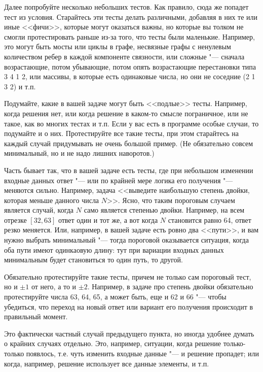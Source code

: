 \documentclass[a4paper,10pt]{problems}
\begin{document}
Далее попробуйте несколько небольших тестов. Как правило, сюда же попадет тест из условия. 
Старайтесь эти тесты делать различными, добавляя в них те или иные <<фичи>>, которые могут оказаться важны, 
но которые вы толком не смогли протестировать раньше из-за того, что тесты были маленькие. 
Например, это могут быть мосты или циклы в графе, несвязные графы с ненулевым количеством ребер в каждой компоненте связности, 
или сложные "--- сначала возрастающие, потом убывающие, потом опять возрастающие перестановки типа 3 4 1 2, или массивы, в которые есть одинаковые числа, 
но они не соседние (2 1 3 2) и т.п.

Подумайте, какие в вашей задаче могут быть <<подлые>> тесты. 
Например, когда решения нет, или когда решение в каком-то смысле пограничное, или не такое, как во многих тестах и т.п.
Если у вас есть в программе особые случаи, то подумайте и о них. 
Протестируйте все такие тесты, при этом старайтесь на каждый случай придумывать не очень большой пример. 
(Не обязательно совсем минимальный, но и не надо лишних наворотов.)

Часть бывает так, что в вашей задаче есть тесты, где при небольшом изменении входные данных ответ "--- или по крайней мере логика его получения "--- меняются сильно.
Например, задача <<выведите наибольшую степень двойки, которая меньше данного числа $N$>>. 
Ясно, что таким пороговым случаем является случай, когда $N$ само является степенью двойки. 
Например, на всем отрезке $[32,63]$ ответ один и тот же, а вот когда $N$ становится равно 64, ответ резко меняется.
Или, например, в вашей задаче есть ровно два <<пути>>, и вам нужно выбрать минимальный "--- тогда пороговой оказывается ситуация,
когда оба пути имеют одинкаовую длину: тут при вариации входных данных минимальным будет становиться то один путь, то другой.

Обязательно протестируйте такие тесты, причем не только сам пороговый тест, но и $\pm 1$ от него, а то и $\pm 2$. 
Например, в задаче про степень двойки обязательно протестируйте числа 63, 64, 65, а может быть, еще и 62 и 66 "--- 
чтобы убедиться, что переход на новый ответ или вариант его получения происходит в правильный момент.

Это фактически частный случай предыдущего пункта, но иногда удобнее думать о крайних случаях отдельно. 
Это, например, ситуации, когда решение только-только появлось, т.е. чуть изменить входные данные "--- и решение пропадет; или когда, например,
решение использует все данные элементы, и т.п.
\end{document}
